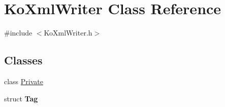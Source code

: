 \hypertarget{classKoXmlWriter}{
\section{KoXmlWriter Class Reference}
\label{classKoXmlWriter}
}


{\ttfamily \#include $<$KoXmlWriter.h$>$}

\subsection*{Classes}
\begin{DoxyCompactItemize}
\item 
class \hyperlink{classKoXmlWriter_1_1Private}{Private}
\item 
struct {\bfseries Tag}
\end{DoxyCompactItemize}
